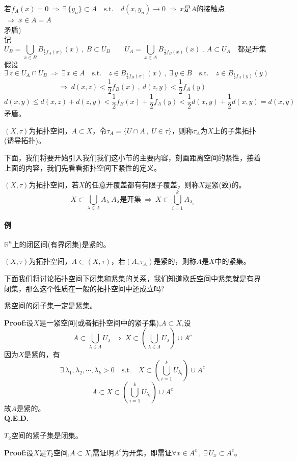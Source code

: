若$f_A(x)=0 \ \Rightarrow \ \exists \, \{y_n\} \subset A \quad \text{s.t.} \quad d(x,y_n) \to 0 \ \Rightarrow \ x$是$A$的接触点$ \ \Rightarrow \ x \in \bar{A}=A$\\
矛盾)\\
记
\[U_B=\bigcup_{x \in B}B_{\frac{1}{2}f_A(x)}(x) \ , \ B \subset U_B \qquad U_A=\bigcup_{x \in A}B_{\frac{1}{2}f_B(x)}(x) \ , \ A \subset U_A \quad \text{都是开集}\]
假设
\[\exists \, z \in U_A \cap U_B \ \Rightarrow \ \exists \, x \in A \quad \text{s.t.} \quad z \in B_{\frac{1}{2}f_B(x)}(x) \ , \ \exists \, y \in B \quad \text{s.t.} \quad z \in B_{\frac{1}{2}f_A(y)}(y)\]
\[\Rightarrow \ d(x,z)<\frac{1}{2}f_B(x) \ , \ d(z,y)<\frac{1}{2}f_A(y)\]
\[d(x,y) \leq d(x,z)+d(z,y)<\frac{1}{2}f_B(x)+\frac{1}{2}f_A(y)<\frac{1}{2}d(x,y)+\frac{1}{2}d(x,y)=d(x,y)\]
矛盾。
\begin{definition}[子集拓扑]
    $(X,\tau)$为拓扑空间，$A \subset X$，令$\tau_A=\{U \cap A \ , \ U \in \tau\}$，则称$\tau_A$为$X$上的子集拓扑(诱导拓扑)。
\end{definition}
下面，我们将要开始引入我们我们这小节的主要内容，刻画距离空间的紧性，接着上面的内容，我们先看看拓扑空间下紧性的定义。
\begin{definition}[紧(致)性]
    $(X,\tau)$为拓扑空间，若$X$的任意开覆盖都有有限子覆盖，则称$X$是紧(致)的。
    \[X \subset \bigcup_{\lambda \in \Lambda}A_{\lambda} \ \text{$A_{\lambda}$是开集} \ \Rightarrow \ X \subset \bigcup_{i=1}^kA_{\lambda_i}\]
\end{definition}
\paragraph*{例} $\mathbb{R}^n$上的闭区间(有界闭集)是紧的。
\begin{definition}[紧集]
    $(X,\tau)$为拓扑空间，$A \subset (X,\tau)$，若$(A,\tau_A)$是紧的，则称$A$是$X$中的紧集。
\end{definition}
下面我们将讨论拓扑空间下闭集和紧集的关系，我们知道欧氏空间中紧集就是有界闭集，那么这个性质在一般的拓扑空间中还成立吗?
\begin{theorem}
    紧空间的闭子集一定是紧集。
\end{theorem}
\textbf{Proof:}设$X$是一紧空间(或者拓扑空间中的紧子集),$A \subset X$,设
\[A \subset \bigcup_{\lambda \in \Lambda}U_{\lambda} \ \Rightarrow \ X \subset \left(\bigcup_{\lambda \in \Lambda}U_{\lambda}\right) \cup A^c\]
因为$X$是紧的，有
\[\exists \, \lambda_1,\lambda_2,\cdots,\lambda_k>0 \quad \text{s.t.} \quad X \subset \left(\bigcup_{i=1}^kU_{\lambda_i}\right) \cup A^c\]
\[A \subset X \subset \left(\bigcup_{i=1}^kU_{\lambda_i}\right) \cup A^c\]
故$A$是紧的。\\
\textbf{Q.E.D.}
\begin{theorem}
    $T_2$空间的紧子集是闭集。
\end{theorem}
\textbf{Proof:}设$X$是$T_2$空间,$A \subset X$,需证明$A^c$为开集，即需证$\forall x \in A^c \ , \ \exists \, U_x \subset A^c$。

